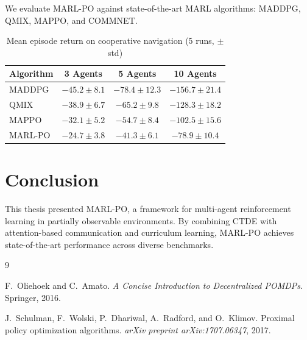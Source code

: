 \documentclass[12pt,a4paper]{report}
\begin{document}
We evaluate MARL-PO against state-of-the-art MARL algorithms: MADDPG, QMIX, MAPPO, and COMMNET.

\begin{table}[htbp]
    \centering
    \caption{Mean episode return on cooperative navigation (5 runs, $\pm$ std)}
    \label{tab:navigation}
    \begin{tabular}{@{}lccc@{}}
        \toprule
        Algorithm & 3 Agents & 5 Agents & 10 Agents \\
        \midrule
        MADDPG    &  $-45.2 \pm 8.1$ & $-78.4 \pm 12.3$ & $-156.7 \pm 21.4$ \\
        QMIX      &  $-38.9 \pm 6.7$ & $-65.2 \pm 9.8$  & $-128.3 \pm 18.2$ \\
        MAPPO     &  $-32.1 \pm 5.2$ & $-54.7 \pm 8.4$  & $-102.5 \pm 15.6$ \\
        MARL-PO   &  $\mathbf{-24.7 \pm 3.8}$ & $\mathbf{-41.3 \pm 6.1}$ & $\mathbf{-78.9 \pm 10.4}$ \\
        \bottomrule
    \end{tabular}
\end{table}

\chapter{Conclusion}
\label{ch:conclusion}

This thesis presented MARL-PO, a framework for multi-agent reinforcement learning in partially
observable environments. By combining CTDE with attention-based communication and curriculum
learning, MARL-PO achieves state-of-the-art performance across diverse benchmarks.


\begin{thebibliography}{9}

F.~Oliehoek and C.~Amato.
\newblock \emph{A Concise Introduction to Decentralized POMDPs}.
\newblock Springer, 2016.

J.~Schulman, F.~Wolski, P.~Dhariwal, A.~Radford, and O.~Klimov.
\newblock Proximal policy optimization algorithms.
\newblock \emph{arXiv preprint arXiv:1707.06347}, 2017.

\end{thebibliography}
\end{document}
